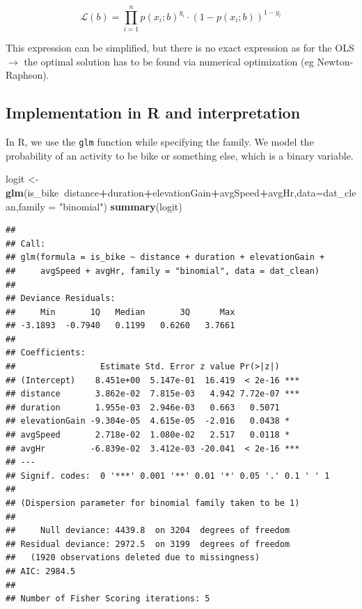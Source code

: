 \documentclass[
]{book}
\newenvironment{Shaded}{\begin{snugshade}}{\end{snugshade}}
\newcommand{\DataTypeTok}[1]{\textcolor[rgb]{0.13,0.29,0.53}{#1}}
\newcommand{\KeywordTok}[1]{\textcolor[rgb]{0.13,0.29,0.53}{\textbf{#1}}}
\newcommand{\NormalTok}[1]{#1}
\newcommand{\OperatorTok}[1]{\textcolor[rgb]{0.81,0.36,0.00}{\textbf{#1}}}
\newcommand{\StringTok}[1]{\textcolor[rgb]{0.31,0.60,0.02}{#1}}
\begin{document}
\[\mathcal{L}(b) = \prod_{i=1}^n p(x_i;b)^{y_i} \cdot (1-p(x_i;b))^{1-y_i}\]

This expression can be simplified, but there is no exact expression as for the OLS \(\rightarrow\) the optimal solution has to be found via numerical optimization (eg Newton-Raphson).

\hypertarget{implementation-in-r-and-interpretation}{%
\subsection{Implementation in R and interpretation}\label{implementation-in-r-and-interpretation}}

In R, we use the \texttt{glm} function while specifying the family. We model the probability of an activity to be bike or something else, which is a binary variable.

\begin{Shaded}
\begin{Highlighting}[]
\NormalTok{logit <-}\StringTok{ }\KeywordTok{glm}\NormalTok{(is_bike}\OperatorTok{~}\NormalTok{distance}\OperatorTok{+}\NormalTok{duration}\OperatorTok{+}\NormalTok{elevationGain}\OperatorTok{+}\NormalTok{avgSpeed}\OperatorTok{+}\NormalTok{avgHr,}\DataTypeTok{data=}\NormalTok{dat_clean,}\DataTypeTok{family =} \StringTok{"binomial"}\NormalTok{)}
\KeywordTok{summary}\NormalTok{(logit)}
\end{Highlighting}
\end{Shaded}

\begin{verbatim}
## 
## Call:
## glm(formula = is_bike ~ distance + duration + elevationGain + 
##     avgSpeed + avgHr, family = "binomial", data = dat_clean)
## 
## Deviance Residuals: 
##     Min       1Q   Median       3Q      Max  
## -3.1893  -0.7940   0.1199   0.6260   3.7661  
## 
## Coefficients:
##                 Estimate Std. Error z value Pr(>|z|)    
## (Intercept)    8.451e+00  5.147e-01  16.419  < 2e-16 ***
## distance       3.862e-02  7.815e-03   4.942 7.72e-07 ***
## duration       1.955e-03  2.946e-03   0.663   0.5071    
## elevationGain -9.304e-05  4.615e-05  -2.016   0.0438 *  
## avgSpeed       2.718e-02  1.080e-02   2.517   0.0118 *  
## avgHr         -6.839e-02  3.412e-03 -20.041  < 2e-16 ***
## ---
## Signif. codes:  0 '***' 0.001 '**' 0.01 '*' 0.05 '.' 0.1 ' ' 1
## 
## (Dispersion parameter for binomial family taken to be 1)
## 
##     Null deviance: 4439.8  on 3204  degrees of freedom
## Residual deviance: 2972.5  on 3199  degrees of freedom
##   (1920 observations deleted due to missingness)
## AIC: 2984.5
## 
## Number of Fisher Scoring iterations: 5
\end{verbatim}
\end{document}
